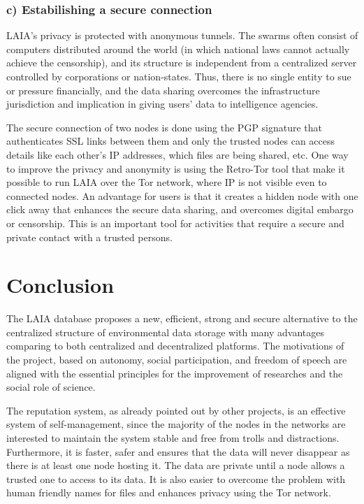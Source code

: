 \documentclass[conference,final,]{IEEEtran}
\begin{document}
\hypertarget{c-estabilishing-a-secure-connection}{%
\subsubsection{c) Estabilishing a secure
connection}\label{c-estabilishing-a-secure-connection}}

LAIA's privacy is protected with anonymous tunnels. The swarms often
consist of computers distributed around the world (in which national
laws cannot actually achieve the censorship), and its structure is
independent from a centralized server controlled by corporations or
nation-states. Thus, there is no single entity to sue or pressure
financially, and the data sharing overcomes the infrastructure
jurisdiction and implication in giving users' data to intelligence
agencies.

The secure connection of two nodes is done using the PGP signature that
authenticates SSL links between them and only the trusted nodes can
access details like each other's IP addresses, which files are being
shared, etc. One way to improve the privacy and anonymity is using
the Retro-Tor tool that make it possible to run LAIA over the Tor
network, where IP is not visible even to connected nodes. An advantage
for users is that it creates a hidden node with one click away that
enhances the secure data sharing, and overcomes digital embargo or
censorship. This is an important tool for activities that require a
secure and private contact with a trusted persons.

\hypertarget{conclusion}{%
\section{Conclusion}\label{conclusion}}

The LAIA database proposes a new, efficient, strong and secure
alternative to the centralized structure of environmental data
storage with many advantages comparing to both centralized and
decentralized platforms. The motivations of the project, based on
autonomy, social participation, and freedom of speech are aligned
with the essential principles for the improvement of researches
and the social role of science.

The reputation system, as already pointed out by other projects, is an
effective system of self-management, since the majority of the nodes in
the networks are interested to maintain the system stable and free from
trolls and distractions. Furthermore, it is faster, safer and ensures
that the data will never disappear as there is at least one node hosting
it. The data are private until a node allows a trusted one to access to
its data. It is also easier to overcome the problem with human friendly
names for files and enhances privacy using the Tor network.
\end{document}
